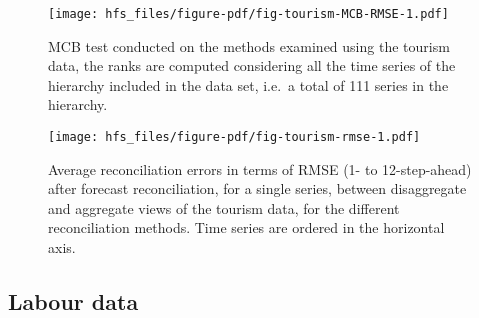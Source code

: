 \documentclass[
  letterpaper,
  DIV=11,
  numbers=noendperiod]{scrartcl}
\begin{document}
\begin{figure}

{\centering \texttt{[image: hfs\_files/figure-pdf/fig-tourism-MCB-RMSE-1.pdf]}

}

\caption{\label{fig-tourism-MCB-RMSE}MCB test conducted on the methods
examined using the tourism data, the ranks are computed considering all
the time series of the hierarchy included in the data set, i.e.~a total
of 111 series in the hierarchy.}

\end{figure}

\begin{figure}

{\centering \texttt{[image: hfs\_files/figure-pdf/fig-tourism-rmse-1.pdf]}

}

\caption{\label{fig-tourism-rmse}Average reconciliation errors in terms
of RMSE (1- to 12-step-ahead) after forecast reconciliation, for a
single series, between disaggregate and aggregate views of the tourism
data, for the different reconciliation methods. Time series are ordered
in the horizontal axis.}

\end{figure}

\hypertarget{labour-data}{%
\subsection{Labour data}\label{labour-data}}
\end{document}
